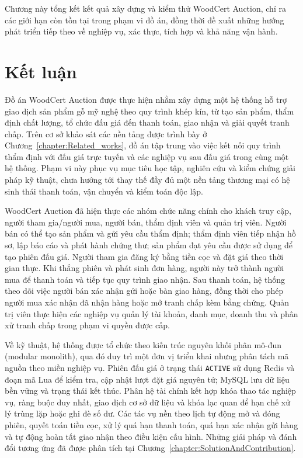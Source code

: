 \documentclass[../DoAn.tex]{subfiles}
\begin{document}
Chương này tổng kết kết quả xây dựng và kiểm thử WoodCert Auction, chỉ ra các giới hạn còn tồn tại trong phạm vi đồ án, đồng thời đề xuất những hướng phát triển tiếp theo về nghiệp vụ, xác thực, tích hợp và khả năng vận hành.

\section{Kết luận}

Đồ án WoodCert Auction được thực hiện nhằm xây dựng một hệ thống hỗ trợ giao dịch sản phẩm gỗ mỹ nghệ theo quy trình khép kín, từ tạo sản phẩm, thẩm định chất lượng, tổ chức đấu giá đến thanh toán, giao nhận và giải quyết tranh chấp. Trên cơ sở khảo sát các nền tảng được trình bày ở Chương~\ref{chapter:Related_works}, đồ án tập trung vào việc kết nối quy trình thẩm định với đấu giá trực tuyến và các nghiệp vụ sau đấu giá trong cùng một hệ thống. Phạm vi này phục vụ mục tiêu học tập, nghiên cứu và kiểm chứng giải pháp kỹ thuật, chưa hướng tới thay thế đầy đủ một nền tảng thương mại có hệ sinh thái thanh toán, vận chuyển và kiểm toán độc lập.

WoodCert Auction đã hiện thực các nhóm chức năng chính cho khách truy cập, người tham gia/người mua, người bán, thẩm định viên và quản trị viên. Người bán có thể tạo sản phẩm và gửi yêu cầu thẩm định; thẩm định viên tiếp nhận hồ sơ, lập báo cáo và phát hành chứng thư; sản phẩm đạt yêu cầu được sử dụng để tạo phiên đấu giá. Người tham gia đăng ký bằng tiền cọc và đặt giá theo thời gian thực. Khi thắng phiên và phát sinh đơn hàng, người này trở thành người mua để thanh toán và tiếp tục quy trình giao nhận. Sau thanh toán, hệ thống theo dõi việc người bán xác nhận gửi hoặc bàn giao hàng, đồng thời cho phép người mua xác nhận đã nhận hàng hoặc mở tranh chấp kèm bằng chứng. Quản trị viên thực hiện các nghiệp vụ quản lý tài khoản, danh mục, doanh thu và phân xử tranh chấp trong phạm vi quyền được cấp.

Về kỹ thuật, hệ thống được tổ chức theo kiến trúc nguyên khối phân mô-đun (modular monolith), qua đó duy trì một đơn vị triển khai nhưng phân tách mã nguồn theo miền nghiệp vụ. Phiên đấu giá ở trạng thái \texttt{ACTIVE} sử dụng Redis và đoạn mã Lua để kiểm tra, cập nhật lượt đặt giá nguyên tử; MySQL lưu dữ liệu bền vững và trạng thái kết thúc. Phân hệ tài chính kết hợp khóa thao tác nghiệp vụ, ràng buộc duy nhất, giao dịch cơ sở dữ liệu và khóa lạc quan để hạn chế xử lý trùng lặp hoặc ghi đè số dư. Các tác vụ nền theo lịch tự động mở và đóng phiên, quyết toán tiền cọc, xử lý quá hạn thanh toán, quá hạn xác nhận gửi hàng và tự động hoàn tất giao nhận theo điều kiện cấu hình. Những giải pháp và đánh đổi tương ứng đã được phân tích tại Chương~\ref{chapter:SolutionAndContribution}.
\end{document}
